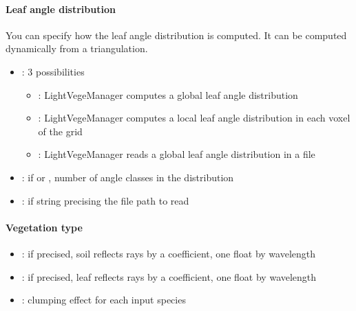 \documentclass[letterpaper,10pt,english]{sphinxmanual}
\begin{document}
\paragraph{Leaf angle distribution}
\label{\detokenize{inputs:leaf-angle-distribution}}
\sphinxAtStartPar
You can specify how the leaf angle distribution is computed. It can be computed dynamically from a triangulation.
\begin{itemize}
\item {} 
\sphinxAtStartPar
{}: 3 possibilities
\begin{itemize}
\item {} 
\sphinxAtStartPar
{}: LightVegeManager computes a global leaf angle distribution

\item {} 
\sphinxAtStartPar
{}: LightVegeManager computes a local leaf angle distribution in each voxel of the grid

\item {} 
\sphinxAtStartPar
{}: LightVegeManager reads a global leaf angle distribution in a file

\end{itemize}

\item {} 
\sphinxAtStartPar
{}: if  or , number of angle classes in the distribution

\item {} 
\sphinxAtStartPar
{}: if  string precising the file path to read

\end{itemize}


\paragraph{Vegetation type}
\label{\detokenize{inputs:vegetation-type}}\begin{itemize}
\item {} 
\sphinxAtStartPar
{}: if precised, soil reflects rays by a coefficient, one float by wavelength 

\item {} 
\sphinxAtStartPar
{}: if precised, leaf reflects rays by a coefficient, one float by wavelength 

\item {} 
\sphinxAtStartPar
{}: clumping effect for each input species

\end{itemize}
\end{document}
